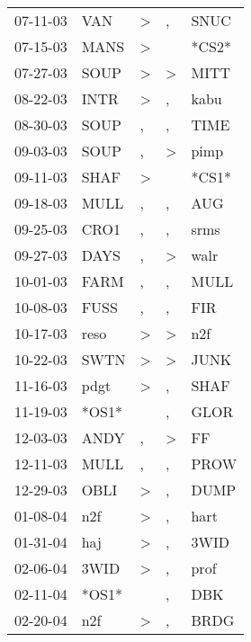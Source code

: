 \begin{supertabular}{lllll}
 07-11-03 &    VAN &     \textgreater &                , &   SNUC \\
 07-15-03 &   MANS &     \textgreater &                  &  *CS2* \\
 07-27-03 &   SOUP &     \textgreater &     \textgreater &   MITT \\
 08-22-03 &   INTR &     \textgreater &                , &   kabu \\
 08-30-03 &   SOUP &                , &                , &   TIME \\
 09-03-03 &   SOUP &                , &     \textgreater &   pimp \\
 09-11-03 &   SHAF &     \textgreater &                  &  *CS1* \\
 09-18-03 &   MULL &                , &                , &    AUG \\
 09-25-03 &   CRO1 &                , &                , &   srms \\
 09-27-03 &   DAYS &                , &     \textgreater &   walr \\
 10-01-03 &   FARM &                , &                , &   MULL \\
 10-08-03 &   FUSS &                , &                , &    FIR \\
 10-17-03 &   reso &     \textgreater &     \textgreater &    n2f \\
 10-22-03 &   SWTN &     \textgreater &     \textgreater &   JUNK \\
 11-16-03 &   pdgt &     \textgreater &                , &   SHAF \\
 11-19-03 &  *OS1* &                  &                , &   GLOR \\
 12-03-03 &   ANDY &                , &     \textgreater &     FF \\
 12-11-03 &   MULL &                , &                , &   PROW \\
 12-29-03 &   OBLI &     \textgreater &                , &   DUMP \\
 01-08-04 &    n2f &     \textgreater &                , &   hart \\
 01-31-04 &    haj &     \textgreater &                , &   3WID \\
 02-06-04 &   3WID &     \textgreater &                , &   prof \\
 02-11-04 &  *OS1* &                  &                , &    DBK \\
 02-20-04 &    n2f &     \textgreater &                , &   BRDG \\

\end{supertabular}
